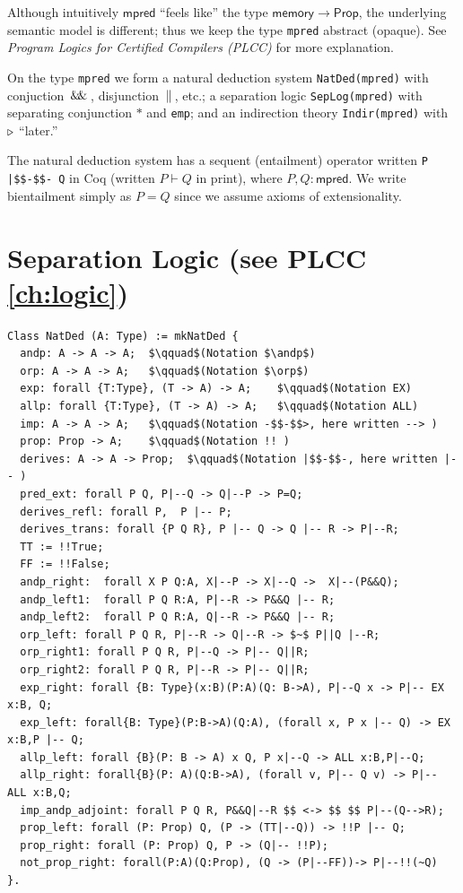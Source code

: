 \documentclass[12pt,fleqn,openany,oneside,showtrims]{memoir}
\newcommand{\ychapter}[2]{\chapter[#1]{#1 \hfill \normalsize #2}}
\begin{document}
Although intuitively $\mathsf{mpred}$
``feels like'' the type $\mathsf{memory}\rightarrow\mathsf{Prop}$,
the underlying semantic model is different;
thus we keep the type \lstinline{mpred} abstract (opaque).
See \emph{Program Logics for Certified Compilers (PLCC)} 
for more explanation.

On the type \lstinline{mpred}
we form a natural deduction  system 
\lstinline{NatDed(mpred)} with 
conjuction $\,\mathsf{\&\hspace{-.2em}\&}\,$, disjunction $\,\|\,$, etc.;
a separation logic 
\lstinline{SepLog(mpred)} with 
separating conjunction $*$ and \lstinline{emp};
and an indirection theory 
\lstinline{Indir(mpred)} with $\triangleright$ ``later.''

The natural deduction system has a sequent
(entailment) operator written \lstinline{P |$$-$$- Q} in Coq
(written $P\vdash Q$ in print), where $P,Q:\mathsf{mpred}$.  We write
bientailment simply as $P=Q$ since we
assume axioms of extensionality.




\ychapter{Separation Logic}{(see PLCC \autoref{ch:logic})}
\begin{lstlisting}
Class NatDed (A: Type) := mkNatDed {
  andp: A -> A -> A;  $\qquad$(Notation $\andp$)
  orp: A -> A -> A;   $\qquad$(Notation $\orp$)
  exp: forall {T:Type}, (T -> A) -> A;    $\qquad$(Notation EX)
  allp: forall {T:Type}, (T -> A) -> A;   $\qquad$(Notation ALL)
  imp: A -> A -> A;   $\qquad$(Notation -$$-$$>, here written --> )
  prop: Prop -> A;    $\qquad$(Notation !! )
  derives: A -> A -> Prop;  $\qquad$(Notation |$$-$$-, here written |-- )
  pred_ext: forall P Q, P|--Q -> Q|--P -> P=Q;
  derives_refl: forall P,  P |-- P;
  derives_trans: forall {P Q R}, P |-- Q -> Q |-- R -> P|--R;
  TT := !!True;
  FF := !!False;
  andp_right:  forall X P Q:A, X|--P -> X|--Q ->  X|--(P&&Q);
  andp_left1:  forall P Q R:A, P|--R -> P&&Q |-- R;
  andp_left2:  forall P Q R:A, Q|--R -> P&&Q |-- R;
  orp_left: forall P Q R, P|--R -> Q|--R -> $~$ P||Q |--R;
  orp_right1: forall P Q R, P|--Q -> P|-- Q||R;
  orp_right2: forall P Q R, P|--R -> P|-- Q||R;
  exp_right: forall {B: Type}(x:B)(P:A)(Q: B->A), P|--Q x -> P|-- EX x:B, Q;
  exp_left: forall{B: Type}(P:B->A)(Q:A), (forall x, P x |-- Q) -> EX x:B,P |-- Q;
  allp_left: forall {B}(P: B -> A) x Q, P x|--Q -> ALL x:B,P|--Q;
  allp_right: forall{B}(P: A)(Q:B->A), (forall v, P|-- Q v) -> P|-- ALL x:B,Q;
  imp_andp_adjoint: forall P Q R, P&&Q|--R $$ <-> $$ $$ P|--(Q-->R);
  prop_left: forall (P: Prop) Q, (P -> (TT|--Q)) -> !!P |-- Q;
  prop_right: forall (P: Prop) Q, P -> (Q|-- !!P);
  not_prop_right: forall(P:A)(Q:Prop), (Q -> (P|--FF))-> P|--!!(~Q)
}.
\end{lstlisting}
\end{document}
